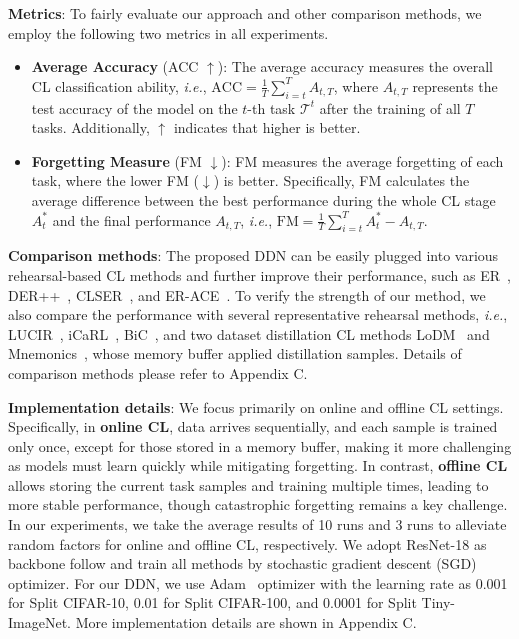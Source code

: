 \documentclass[table, xcdraw]{article}
\theoremstyle{plain}
\theoremstyle{definition}
\theoremstyle{remark}
\begin{document}
\textbf{Metrics}:
To fairly evaluate our approach and other comparison methods, we employ the following two metrics in all experiments.
\begin{itemize}[leftmargin=4mm, itemsep=0mm, topsep=-0.5 mm]
    \item \textbf{Average Accuracy} (ACC $\uparrow$):
    The average accuracy measures the overall CL classification ability, \textit{i.e.}, $\mathrm{ACC} = \frac{1}{T} \sum_{i=t}^T A_{t, T}$, where $A_{t, T}$ represents the test accuracy of the model on the $t$-th task $\mathcal{T}^t$ after the training of all $T$ tasks. Additionally, $\uparrow$ indicates that higher is better.
    \item \textbf{Forgetting Measure} (FM $\downarrow$):
    FM measures the average forgetting of each task, where the lower FM ($\downarrow$) is better. Specifically, FM calculates the average difference between the best performance during the whole CL stage $A^*_t$ and the final performance $A_{t, T}$, \textit{i.e.}, $\mathrm{FM} = \frac{1}{T} \sum_{i=t}^T A^*_t - A_{t, T}$.
\end{itemize}

\textbf{Comparison methods}:
The proposed DDN can be easily plugged into various rehearsal-based CL methods and further improve their performance, such as ER~\cite{ERratcliff1990connectionist}, DER++~\cite{derpp}, CLSER~\cite{clser}, and ER-ACE~\cite{ERACE}. To verify the strength of our method, we also compare the performance with several representative rehearsal methods, \textit{i.e.}, LUCIR~\cite{LUCIR}, iCaRL~\cite{icarl}, BiC~\cite{BIC}, and two dataset distillation CL methods LoDM~\cite{LoDM} and Mnemonics~\cite{liu2020mnemonics}, whose memory buffer applied distillation samples. Details of comparison methods please refer to Appendix C.

\textbf{Implementation details}:
We focus primarily on online and offline CL settings. Specifically, in \textbf{online CL}, data arrives sequentially, and each sample is trained only once, except for those stored in a memory buffer, making it more challenging as models must learn quickly while mitigating forgetting. In contrast, \textbf{offline CL} allows storing the current task samples and training multiple times, leading to more stable performance, though catastrophic forgetting remains a key challenge.
In our experiments, we take the average results of 10 runs and 3 runs to alleviate random factors for online and offline CL, respectively. We adopt ResNet-18 as backbone follow \cite{derpp} and train all methods by stochastic gradient descent (SGD) optimizer. For our DDN, we use Adam~\cite{adam} optimizer with the learning rate as 0.001 for Split CIFAR-10, 0.01 for Split CIFAR-100, and 0.0001 for Split Tiny-ImageNet. More implementation details are shown in Appendix C.
\end{document}
